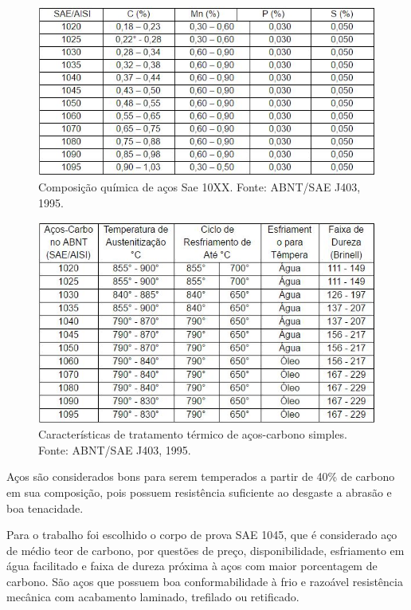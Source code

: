 \begin{figure}[H]
	\centering
	\label{tab_sae1}
	\includegraphics[keepaspectratio=true,scale=0.8]{figuras/tab_sae1.JPG}
	\caption{Composição química de aços Sae 10XX\@. Fonte: ABNT/SAE J403, 1995.}
\end{figure}

\begin{figure}[H]
	\centering
	\label{tab_sae2}
	\includegraphics[keepaspectratio=true,scale=0.8]{figuras/tab_sae2.JPG}
	\caption{Características de tratamento térmico de aços-carbono simples.  Fonte: ABNT/SAE J403, 1995.}
\end{figure}

Aços são considerados bons para serem temperados a partir de 40\% de carbono em sua composição, pois possuem resistência suficiente ao desgaste a abrasão e boa tenacidade.

Para o trabalho foi escolhido o corpo de prova SAE 1045, que é considerado aço de médio teor de carbono, por questões de preço, disponibilidade, esfriamento em água facilitado e faixa de dureza próxima à aços com maior porcentagem de carbono.
São aços que possuem boa conformabilidade à frio e razoável resistência mecânica com acabamento laminado, trefilado ou retificado. 

